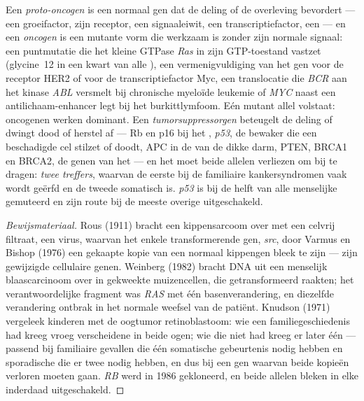 \begin{definition}\label{def:b3:cancer-biology:genes}
Een \emph{proto-oncogen} is een normaal gen dat de deling of de
overleving bevordert --- een groeifactor, zijn receptor, een
signaaleiwit, een transcriptiefactor, een  --- en een
\emph{oncogen} is een mutante vorm die werkzaam is zonder zijn normale
signaal: een puntmutatie die het kleine GTPase \emph{Ras} in zijn
GTP-toestand vastzet (glycine~12 in een kwart van alle ), een
vermenigvuldiging van het gen voor de receptor HER2 of voor de
transcriptiefactor Myc, een translocatie die \emph{BCR} aan het kinase
\emph{ABL} versmelt bij chronische myeloïde leukemie of \emph{MYC} naast
een antilichaam-enhancer legt bij het burkittlymfoom. Eén mutant allel
volstaat: oncogenen werken dominant. Een \emph{tumorsuppressorgen}
beteugelt de deling of dwingt dood of herstel af --- Rb en p16 bij het
, \emph{p53}, de bewaker die een beschadigde cel stilzet
of doodt, APC in de  van de dikke darm, PTEN, BRCA1 en BRCA2,
de genen van het  --- en het moet beide allelen
verliezen om bij te dragen: \emph{twee treffers}, waarvan de eerste bij
de familiaire kankersyndromen vaak wordt geërfd en de tweede somatisch
is. \emph{p53} is bij de helft van alle menselijke  gemuteerd en
zijn route bij de meeste overige uitgeschakeld.
\end{definition}

\begin{proof}[Bewijsmateriaal]
Rous (1911) bracht een kippensarcoom over met een celvrij filtraat, een
virus, waarvan het enkele transformerende gen, \emph{src}, door Varmus
en Bishop (1976) een gekaapte kopie van een normaal kippengen bleek te
zijn ---  zijn gewijzigde cellulaire genen. Weinberg (1982)
bracht DNA uit een menselijk blaascarcinoom over in gekweekte
muizencellen, die getransformeerd raakten; het verantwoordelijke
fragment was \emph{RAS} met één basenverandering, en diezelfde
verandering ontbrak in het normale weefsel van de patiënt. Knudson
(1971) vergeleek kinderen met de oogtumor retinoblastoom: wie een
familiegeschiedenis had kreeg vroeg verscheidene  in beide ogen;
wie die niet had kreeg er later één --- passend bij familiaire gevallen
die één somatische gebeurtenis nodig hebben en sporadische die er twee
nodig hebben, en dus bij een gen waarvan beide kopieën verloren moeten
gaan. \emph{RB} werd in 1986 gekloneerd, en beide allelen bleken in
elke  inderdaad uitgeschakeld.
\end{proof}

